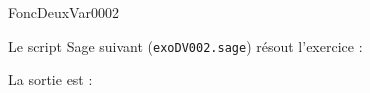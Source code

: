 \begin{corrige}{FoncDeuxVar0002}

Le script Sage suivant (\verb+exoDV002.sage+) résout l'exercice : 



La sortie est :


\end{corrige}
